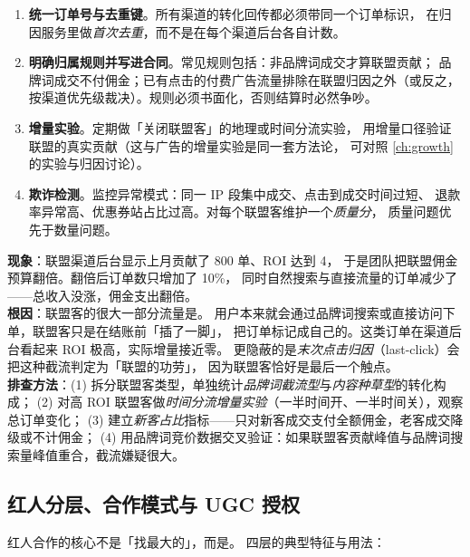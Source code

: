 \begin{enumerate}
  \item \textbf{统一订单号与去重键}。所有渠道的转化回传都必须带同一个订单标识，
        在归因服务里做\emph{首次去重}，而不是在每个渠道后台各自计数。
  \item \textbf{明确归属规则并写进合同}。常见规则包括：非品牌词成交才算联盟贡献；
        品牌词成交不付佣金；已有点击的付费广告流量排除在联盟归因之外（或反之，
        按渠道优先级裁决）。规则必须书面化，否则结算时必然争吵。
  \item \textbf{增量实验}。定期做「关闭联盟客」的地理或时间分流实验，
        用增量口径验证联盟的真实贡献（这与广告的增量实验是同一套方法论，
        可对照 \cref{ch:growth} 的实验与归因讨论）。
  \item \textbf{欺诈检测}。监控异常模式：同一 IP 段集中成交、点击到成交时间过短、
        退款率异常高、优惠券站占比过高。对每个联盟客维护一个\emph{质量分}，
        质量问题优先于数量问题。
\end{enumerate}

\begin{pitfall}
\textbf{现象}：联盟渠道后台显示上月贡献了 800 单、ROI 达到 4，
于是团队把联盟佣金预算翻倍。翻倍后订单数只增加了 10\%，
同时自然搜索与直接流量的订单减少了——总收入没涨，佣金支出翻倍。\\
\textbf{根因}：联盟客的很大一部分流量是。
用户本来就会通过品牌词搜索或直接访问下单，联盟客只是在结账前「插了一脚」，
把订单标记成自己的。这类订单在渠道后台看起来 ROI 极高，实际增量接近零。
更隐蔽的是\emph{末次点击归因}（last-click）会把这种截流判定为「联盟的功劳」，
因为联盟客恰好是最后一个触点。\\
\textbf{排查方法}：(1) 拆分联盟客类型，单独统计\emph{品牌词截流型}与\emph{内容种草型}的转化构成；
(2) 对高 ROI 联盟客做\emph{时间分流增量实验}（一半时间开、一半时间关），观察总订单变化；
(3) 建立\emph{新客占比}指标——只对新客成交支付全额佣金，老客成交降级或不计佣金；
(4) 用品牌词竞价数据交叉验证：如果联盟客贡献峰值与品牌词搜索量峰值重合，截流嫌疑很大。
\end{pitfall}

\subsection{红人分层、合作模式与 UGC 授权}

红人合作的核心不是「找最大的」，而是。
四层的典型特征与用法：

